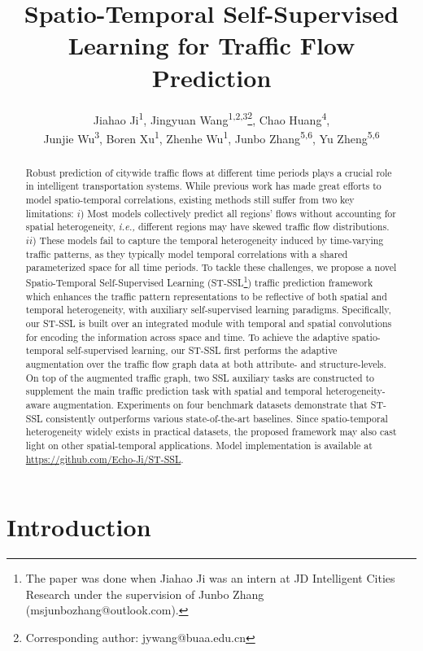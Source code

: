 \documentclass[letterpaper]{article} \usepackage{aaai23}  \usepackage{times}  \usepackage{helvet}  \usepackage{courier}  \usepackage[hyphens]{url}  \usepackage{graphicx} \urlstyle{rm} \def\UrlFont{\rm}  \usepackage{natbib}  \usepackage{caption} \frenchspacing  \setlength{\pdfpagewidth}{8.5in} \setlength{\pdfpageheight}{11in}
\title{Spatio-Temporal Self-Supervised Learning for Traffic Flow Prediction }
\author {
    Jiahao Ji\textsuperscript{\rm 1},
    Jingyuan Wang\textsuperscript{\rm 1,\rm 2,\rm 3}\thanks{Corresponding author: jywang@buaa.edu.cn},
    Chao Huang\textsuperscript{\rm 4},\\
    Junjie Wu\textsuperscript{\rm 3},
    Boren Xu\textsuperscript{\rm 1},
    Zhenhe Wu\textsuperscript{\rm 1},
    Junbo Zhang\textsuperscript{\rm 5,\rm 6},
    Yu Zheng\textsuperscript{\rm 5,\rm 6}
}
\newcommand{\ie}{\emph{i.e.,}\xspace}
\newcommand{\name}{ST-SSL\xspace}
\begin{document}
\maketitle

\begin{abstract}
    Robust prediction of citywide traffic flows at different time periods plays a crucial role in intelligent transportation systems. While previous work has made great efforts to model spatio-temporal correlations, existing methods still suffer from two key limitations: $i$) Most models collectively predict all regions' flows without accounting for spatial heterogeneity, \ie different regions may have skewed traffic flow distributions. $ii$) These models fail to capture the temporal heterogeneity induced by time-varying traffic patterns, as they typically model temporal correlations with a shared parameterized space for all time periods. To tackle these challenges, we propose a novel Spatio-Temporal Self-Supervised Learning (\name\footnote{The paper was done when Jiahao Ji was an intern at JD Intelligent Cities Research under the supervision of Junbo Zhang (msjunbozhang@outlook.com).}) traffic prediction framework which enhances the traffic pattern representations to be reflective of both spatial and temporal heterogeneity, with auxiliary self-supervised learning paradigms. Specifically, our \name is built over an integrated module with temporal and spatial convolutions for encoding the information across space and time. To achieve the adaptive spatio-temporal self-supervised learning, our \name first performs the adaptive augmentation over the traffic flow graph data at both attribute- and structure-levels. On top of the augmented traffic graph, two SSL auxiliary tasks are constructed to supplement the main traffic prediction task with spatial and temporal heterogeneity-aware augmentation. Experiments on four benchmark datasets demonstrate that \name consistently outperforms various state-of-the-art baselines. Since spatio-temporal heterogeneity widely exists in practical datasets, the proposed framework may also cast light on other spatial-temporal applications. Model implementation is available at \url{https://github.com/Echo-Ji/ST-SSL}.


\end{abstract}


\section{Introduction}\label{sec:intro}
\end{document}
